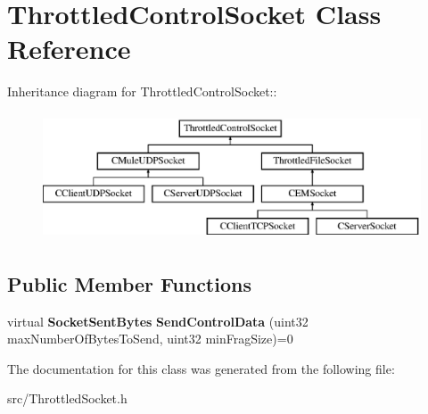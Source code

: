 \section{ThrottledControlSocket Class Reference}
\label{classThrottledControlSocket}
Inheritance diagram for ThrottledControlSocket::\begin{figure}[H]
\begin{center}
\leavevmode
\includegraphics[height=3.78378cm]{classThrottledControlSocket}
\end{center}
\end{figure}
\subsection*{Public Member Functions}
\begin{DoxyCompactItemize}
\item 
virtual {\bf SocketSentBytes} {\bfseries SendControlData} (uint32 maxNumberOfBytesToSend, uint32 minFragSize)=0\label{classThrottledControlSocket_ae526b48d701a4a0db263d1eb18f83b34}

\end{DoxyCompactItemize}


The documentation for this class was generated from the following file:\begin{DoxyCompactItemize}
\item 
src/ThrottledSocket.h\end{DoxyCompactItemize}
